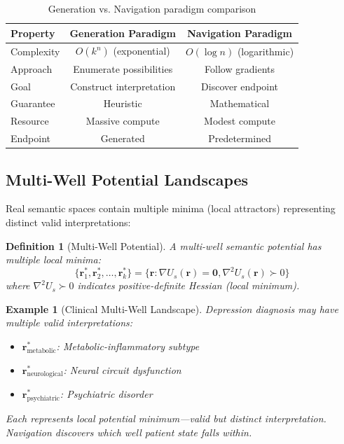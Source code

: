 \documentclass[12pt,a4paper]{article}
\newtheorem{definition}{Definition}
\newtheorem{example}{Example}
\begin{document}
\begin{table}[H]
\centering
\begin{tabular}{lcc}
\toprule
Property & Generation Paradigm & Navigation Paradigm \\
\midrule
Complexity & $O(k^n)$ (exponential) & $O(\log n)$ (logarithmic) \\
Approach & Enumerate possibilities & Follow gradients \\
Goal & Construct interpretation & Discover endpoint \\
Guarantee & Heuristic & Mathematical \\
Resource & Massive compute & Modest compute \\
Endpoint & Generated & Predetermined \\
\bottomrule
\end{tabular}
\caption{Generation vs. Navigation paradigm comparison}
\end{table}

\subsection{Multi-Well Potential Landscapes}

Real semantic spaces contain multiple minima (local attractors) representing distinct valid interpretations:

\begin{definition}[Multi-Well Potential]
A multi-well semantic potential has multiple local minima:
\begin{equation}
\{\mathbf{r}_1^*, \mathbf{r}_2^*, \ldots, \mathbf{r}_k^*\} = \{\mathbf{r}: \nabla U_s(\mathbf{r}) = \mathbf{0}, \nabla^2 U_s(\mathbf{r}) \succ 0\}
\end{equation}
where $\nabla^2 U_s \succ 0$ indicates positive-definite Hessian (local minimum).
\end{definition}

\begin{example}[Clinical Multi-Well Landscape]
Depression diagnosis may have multiple valid interpretations:
\begin{itemize}
\item $\mathbf{r}_{\text{metabolic}}^*$: Metabolic-inflammatory subtype
\item $\mathbf{r}_{\text{neurological}}^*$: Neural circuit dysfunction
\item $\mathbf{r}_{\text{psychiatric}}^*$: Psychiatric disorder
\end{itemize}

Each represents local potential minimum—valid but distinct interpretation. Navigation discovers which well patient state falls within.
\end{example}
\end{document}
